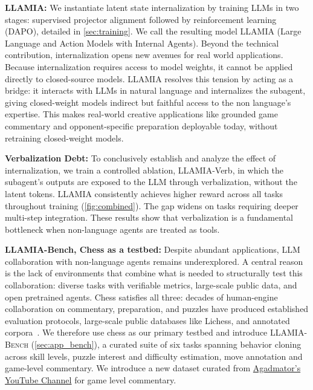 \textbf{LLAMIA:} We instantiate latent state internalization by training LLMs \citep{yang2025qwen3} in two stages: supervised projector alignment followed by reinforcement learning (DAPO), detailed in \cref{sec:training}. We call the resulting model LLAMIA (Large Language and Action Models with Internal Agents). Beyond the technical contribution, internalization opens new avenues for real world applications. Because internalization requires access to model weights, it cannot be applied directly to closed-source models. LLAMIA resolves this tension by acting as a bridge: it interacts with LLMs in natural language and internalizes the subagent, giving closed-weight models indirect but faithful access to the non language's expertise. This makes real-world creative applications like grounded game commentary and opponent-specific preparation deployable today, without retraining closed-weight models.


\textbf{Verbalization Debt:} To conclusively establish and analyze the effect of internalization, we train a controlled ablation, LLAMIA-Verb, in which the subagent's outputs are exposed to the LLM through verbalization, without the latent tokens. LLAMIA consistently achieves higher reward across all tasks throughout training (\cref{fig:combined}). The gap widens on tasks requiring deeper multi-step integration. These results show that verbalization is a fundamental bottleneck when non-language agents are treated as tools.

\textbf{LLAMIA-Bench, Chess as a testbed:} Despite abundant applications, LLM collaboration with non-language agents remains underexplored. A central reason is the lack of environments that combine what is needed to structurally test this collaboration: diverse tasks with verifiable metrics, large-scale public data, and open pretrained agents. Chess satisfies all three: decades of human-engine collaboration on commentary, preparation, and puzzles have produced established evaluation protocols, large-scale public databases like Lichess, and annotated corpora~\cite{feng2024chessgpt}. We therefore use chess as our primary testbed and introduce \textsc{LLAMIA-Bench} (\cref{sec:app_bench}), a curated suite of six tasks spanning behavior cloning across skill levels, puzzle interest and difficulty estimation, move annotation and game-level commentary. We introduce a new dataset curated from \href{https://www.youtube.com/channel/UCL5YbN5WLFD8dLIegT5QAbA}{Agadmator's YouTube Channel} for game level commentary.

